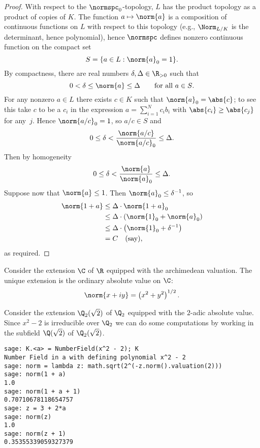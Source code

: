\documentclass[11pt]{book}
\begin{document}
\begin{ch}
\begin{proof}
With respect to the $\normspc_0$-topology, $L$ has the product topology
as a product of copies of $K$.  The
function $a\mapsto \norm{a}$ is a composition of continuous functions on $L$
with respect to this topology (e.g., $\Norm_{L/K}$ is the determinant, hence
polynomial),
hence $\normspc$ defines nonzero continuous function on the compact set
$$
 S = \{a \in L : \norm{a}_0 = 1\}.
$$
By compactness, there are  real numbers $\delta,\Delta\in\R_{>0}$ such that
$$
0 < \delta \leq \norm{a} \leq \Delta \qquad\text{for all $a\in S$}.
$$
For any nonzero $a\in L$ there exists $c\in K$ such that
$\norm{a}_0 = \abs{c}$; to see this take $c$ to be a $c_i$
in the expression $a=\sum_{i=1}^N c_i b_i$ with $\abs{c_i}\geq \abs{c_j}$
for any~$j$.  Hence $\norm{a/c}_0 = 1$, so $a/c\in S$ and
$$
0 \leq \delta < \frac{\norm{a/c}}{\norm{a/c}_0} \leq \Delta.
$$
Then by homogeneity
$$
0 \leq \delta < \frac{\norm{a}}{\norm{a}_0} \leq \Delta.
$$
Suppose now that $\norm{a}\leq 1$.  Then $\norm{a}_0\leq \delta^{-1}$, so
\begin{align*}
 \norm{1+a} &\leq \Delta\cdot \norm{1+a}_0 \\
  &\leq \Delta\cdot \left( \norm{1}_0 + \norm{a}_0\right)\\
  &\leq \Delta\cdot \left( \norm{1}_0 + \delta^{-1}\right)\\
  &=C \quad\text{(say)},
\end{align*}
as required.
\end{proof}

\begin{example}
Consider the extension $\C$ of $\R$ equipped with the archimedean valuation.
The unique extension is the ordinary absolute value on $\C$:
$$\norm{x+iy} = \left(x^2 + y^2\right)^{1/2}.$$
\end{example}

\begin{example}
Consider the extension $\Q_2(\sqrt{2})$ of $\Q_2$
equipped with the $2$-adic absolute value.
Since $x^2-2$ is irreducible over $\Q_2$ we can do
some computations by working in the subfield $\Q(\sqrt{2})$
of $\Q_2(\sqrt{2})$.
\begin{lstlisting}
sage: K.<a> = NumberField(x^2 - 2); K
Number Field in a with defining polynomial x^2 - 2
sage: norm = lambda z: math.sqrt(2^(-z.norm().valuation(2)))
sage: norm(1 + a)
1.0
sage: norm(1 + a + 1)
0.70710678118654757
sage: z = 3 + 2*a
sage: norm(z)
1.0
sage: norm(z + 1)
0.35355339059327379
\end{lstlisting}

\end{example}


\end{ch}
\end{document}
